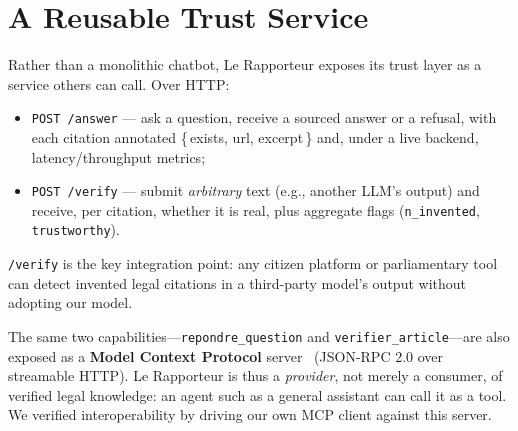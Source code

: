 \section{A Reusable Trust Service}
\label{sec:service}

Rather than a monolithic chatbot, Le Rapporteur exposes its trust layer as a
service others can call. Over HTTP:
\begin{itemize}
  \item \texttt{POST /answer} --- ask a question, receive a sourced answer or a
  refusal, with each citation annotated \{\,exists, url, excerpt\,\} and,
  under a live backend, latency/throughput metrics;
  \item \texttt{POST /verify} --- submit \emph{arbitrary} text (e.g., another
  LLM's output) and receive, per citation, whether it is real, plus aggregate
  flags (\texttt{n\_invented}, \texttt{trustworthy}).
\end{itemize}
\texttt{/verify} is the key integration point: any citizen platform or
parliamentary tool can detect invented legal citations in a third-party model's
output without adopting our model.

The same two capabilities---\texttt{repondre\_question} and
\texttt{verifier\_article}---are also exposed as a \textbf{Model Context
Protocol} server~\cite{mcp2024} (JSON-RPC 2.0 over streamable HTTP). Le
Rapporteur is thus a \emph{provider}, not merely a consumer, of verified legal
knowledge: an agent such as a general assistant can call it as a tool. We
verified interoperability by driving our own MCP client against this server.
